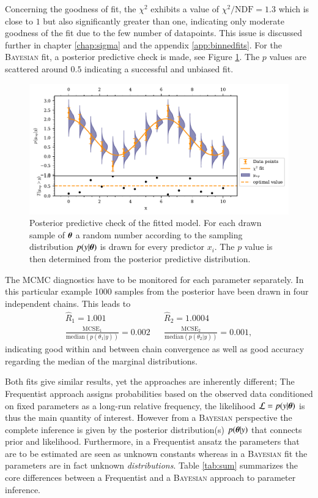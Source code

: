 Concerning the goodness of fit, the $\chi^2$ exhibits a value of $\chi^2/\text{NDF}=1.3$ which is close to $1$ but also significantly greater than one, indicating only moderate goodness of the fit due to the few number of datapoints. This issue is discussed further in chapter \ref{chap:sigma} and the appendix \ref{app:binnedfits}. For the \textsc{Bayesian} fit, a posterior predictive check is made, see Figure \ref{fig:ppc}. The $p$ values are scattered around $0.5$ indicating a successful and unbiased fit.
\begin{figure}[htbp]
	\centering
	\includegraphics[width=\linewidth]{../bayes/noisy_model/ppd_2_params.pdf}
	\caption{Posterior predictive check of the fitted model. For each drawn sample of $\boldsymbol{\theta}$ a random number according to the sampling distribution $p(y|\boldsymbol{\theta})$ is drawn for every predictor $x_i$. The $p$ value is then determined from the posterior predictive distribution.}
	\label{fig:ppc}
\end{figure}
The MCMC diagnostics have to be monitored for each parameter separately. In this particular example 1000 samples from the posterior have been drawn in four independent chains. This leads to
\begin{align}
	\widehat{R}_1 = 1.001 && \widehat{R}_2 = 1.0004\\
	\frac{\text{MCSE}_1}{\text{median}(p(\theta_1|y))}=0.002 &&\frac{\text{MCSE}_2}{\text{median}(p(\theta_2|y))}=0.001,
\end{align}
indicating good within and between chain convergence as well as good accuracy regarding the median of the marginal distributions.

Both fits give similar results, yet the approaches are inherently different; The Frequentist approach assigns probabilities based on the observed data conditioned on fixed parameters as a long-run relative frequency, the likelihood $\mathcal{L}=p(y|\boldsymbol{\theta})$ is thus the main quantity of interest. However from a \textsc{Bayesian} perspective the complete inference is given by the posterior distribution(s) $p(\boldsymbol{\theta}|y)$ that connects prior and likelihood. Furthermore, in a Frequentist ansatz the parameters that are to be estimated are seen as unknown constants whereas in a \textsc{Bayesian} fit the parameters are in fact unknown \emph{distributions}. Table \ref{tab:sum} summarizes the core differences between a Frequentist and a \textsc{Bayesian} approach to parameter inference. \cite{bayes1}


